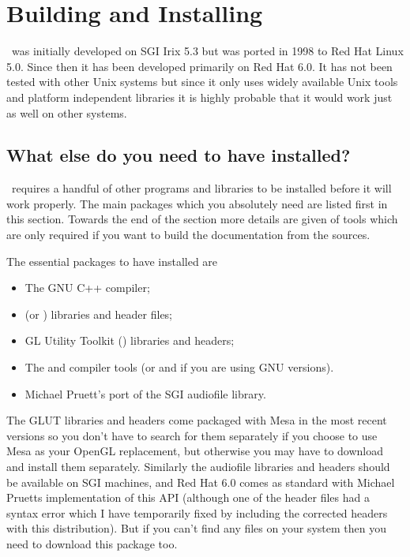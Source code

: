 \chapter{Building and Installing \tao}
\label{section:installation}
\tao\ was initially developed on SGI Irix 5.3 but was ported in 1998 to
Red Hat Linux 5.0. Since then it has been developed primarily on Red
Hat 6.0. It has not been tested with other Unix systems but
since it only uses widely available Unix tools and platform
independent libraries it is highly probable that it would work just
as well on other systems. 

\section{What else do you need to have installed?}
\label{section:whatdoyouneed}
\tao\ requires a handful of other programs and libraries to be
installed before it will work properly. The main packages which
you absolutely need are listed first in this section. Towards
the end of the section more details are given of tools which
are only required if you want to build the documentation from
the sources.

The essential packages to have installed are

\begin{itemize}
\item The GNU C++ compiler;
\item {} (or ) libraries and header files;
\item GL Utility Toolkit () libraries and headers;
\item The  and  compiler tools (or 
and  if you are using GNU versions).
\item Michael Pruett's port of the SGI audiofile library.
\end{itemize}

The GLUT libraries and headers come packaged with Mesa
in the most recent versions so you don't have to search for them
separately if you choose to use Mesa as your OpenGL replacement,
but otherwise you may have to download and install them separately.
Similarly the audiofile libraries and headers should be available
on SGI machines, and Red Hat 6.0 comes as standard with Michael
Pruetts implementation of this API (although one of the header
files had a syntax error which I have temporarily fixed by including
the corrected headers with this distribution). But if you can't
find any  files on your system then you need
to download this package too.

